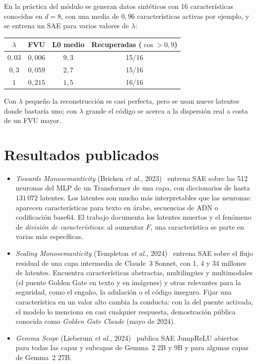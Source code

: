\begin{ejemplo}\label{ej:lambda}
En la práctica del módulo se generan datos sintéticos con 16 características conocidas en $d=8$, con una media de $0{,}96$ características activas por ejemplo, y se entrena un SAE para varios valores de $\lambda$:
\begin{center}\small
\begin{tabular}{@{}cccc@{}}
\toprule
$\lambda$ & FVU & L0 medio & Recuperadas ($\cos>0{,}9$) \\
\midrule
$0{,}03$ & $0{,}006$ & $9{,}3$ & 15/16 \\
$0{,}3$ & $0{,}059$ & $2{,}7$ & 15/16 \\
$1$ & $0{,}215$ & $1{,}5$ & 16/16 \\
\bottomrule
\end{tabular}
\end{center}
Con $\lambda$ pequeño la reconstrucción es casi perfecta, pero se usan nueve latentes donde bastaría uno; con $\lambda$ grande el código se acerca a la dispersión real a costa de un FVU mayor.
\end{ejemplo}

\section{Resultados publicados}

\begin{itemize}[leftmargin=1.4em]
  \item \emph{Towards Monosemanticity} (Bricken \emph{et al.}, 2023)~\cite{bricken} entrena SAE sobre las 512 neuronas del MLP de un Transformer de una capa, con diccionarios de hasta $131\,072$ latentes. Los latentes son mucho más interpretables que las neuronas: aparecen características para texto en árabe, secuencias de ADN o codificación base64. El trabajo documenta los latentes muertos y el fenómeno de \emph{división de características}: al aumentar $F$, una característica se parte en varias más específicas.
  \item \emph{Scaling Monosemanticity} (Templeton \emph{et al.}, 2024)~\cite{templeton} entrena SAE sobre el flujo residual de una capa intermedia de Claude~3 Sonnet, con 1, 4 y 34 millones de latentes. Encuentra características abstractas, multilingües y multimodales (el puente Golden Gate en texto y en imágenes) y otras relevantes para la seguridad, como el engaño, la adulación o el código inseguro. Fijar una característica en un valor alto cambia la conducta: con la del puente activada, el modelo lo menciona en casi cualquier respuesta, demostración pública conocida como \emph{Golden Gate Claude} (mayo de 2024).
  \item \emph{Gemma Scope} (Lieberum \emph{et al.}, 2024)~\cite{gemmascope} publica SAE JumpReLU abiertos para todas las capas y subcapas de Gemma~2 2B y 9B y para algunas capas de Gemma~2 27B.
\end{itemize}

